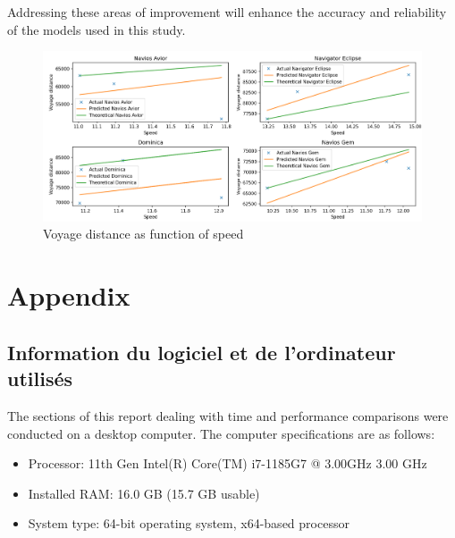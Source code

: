 \documentclass[a4paper,12pt]{article}
\begin{document}
Addressing these areas of improvement will enhance the accuracy and reliability of the models used in this study.

\begin{figure}[H]
	\centering
	\includegraphics[width=0.99\linewidth]{report-fig/voyage_dist.png}
	\caption{Voyage distance as function of speed}
	\label{fig:voyage_dist}
\end{figure}


\newpage
\section{Appendix}

\subsection*{Information du logiciel et de l'ordinateur utilisés}
The sections of this report dealing with time and performance comparisons were conducted on a desktop computer. The computer specifications are as follows:

\begin{itemize}
	\item Processor: 11th Gen Intel(R) Core(TM) i7-1185G7 @ 3.00GHz 3.00 GHz
	\item Installed RAM: 16.0 GB (15.7 GB usable)
	\item System type: 64-bit operating system, x64-based processor
\end{itemize}
\end{document}
